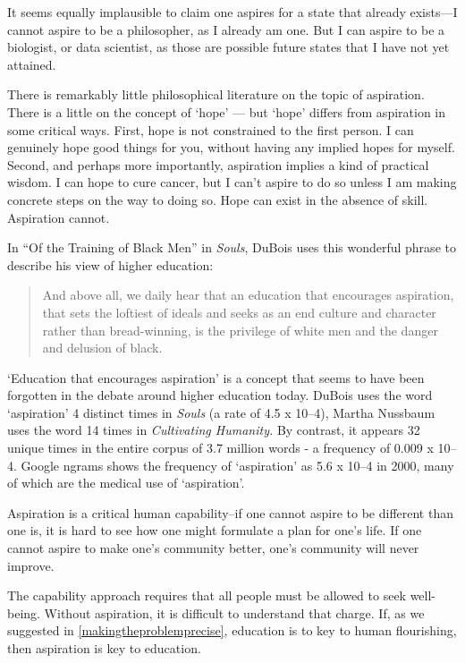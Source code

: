 It seems equally implausible to claim one aspires for a state that already exists---I cannot aspire to be a philosopher, as I already am one. But I can aspire to be a biologist, or data scientist, as those are possible future states that I have not yet attained. 

There is remarkably little philosophical literature on the topic of aspiration. There is a little on the concept of `hope' --- but `hope' differs from aspiration in some critical ways. First, hope is not constrained to the first person. I can genuinely hope good things for you, without having any implied hopes for myself. Second, and perhaps more importantly, aspiration implies a kind of practical wisdom. I can hope to cure cancer, but I can't aspire to do so unless I am making concrete steps on the way to doing so. Hope can exist in the absence of skill. Aspiration cannot.

In ``Of the Training of Black Men'' in \emph{Souls}, DuBois uses this wonderful phrase to describe his view of higher education:

\begin{quote}

And above all, we daily hear that an education that encourages aspiration, that sets the loftiest of ideals and seeks as an end culture and character rather than bread-winning, is the privilege of white men and the danger and delusion of black.
\end{quote}

`Education that encourages aspiration' is a concept that seems to have been forgotten in the debate around higher education today. DuBois uses the word `aspiration' 4 distinct times in \emph{Souls} (a rate of 4.5 x 10--4), Martha Nussbaum uses the word 14 times in \emph{Cultivating Humanity.} By contrast, it appears 32 unique times in the entire corpus of 3.7 million words - a frequency of 0.009 x 10--4. Google ngrams shows the frequency of `aspiration' as 5.6 x 10--4 in 2000, many of which are the medical use of `aspiration'.

Aspiration is a critical human capability--if one cannot aspire to be different than one is, it is hard to see how one might formulate a plan for one's life. If one cannot aspire to make one's community better, one's community will never improve. 

The capability approach requires that all people must be allowed to seek well-being. Without aspiration, it is difficult to understand that charge. If, as we suggested in \ref{makingtheproblemprecise}, education is to key to human flourishing, then aspiration is key to education.

